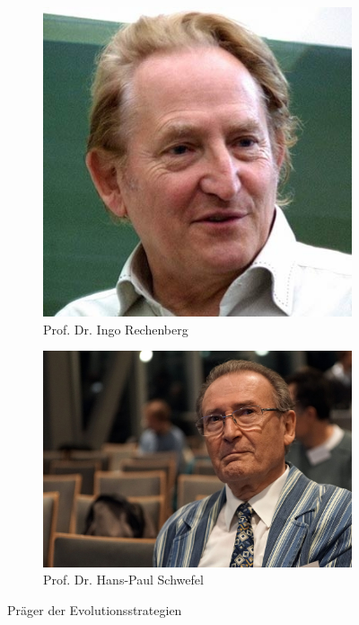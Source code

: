 \begin{figure}[H]
\centering
\begin{subfigure}[b]{0.45\linewidth}
\centering
\includegraphics[height=0.6\textwidth]{img/Prof-Dr-Ingo-Rechenberg.jpg}
\caption[Prof. Dr. Ingo Rechenberg]{Prof. Dr. Ingo Rechenberg\protect\footnotemark}
\label{fig:ingorechenberg}
\end{subfigure}
\hfill
\begin{subfigure}[b]{0.45\linewidth}
\centering
\includegraphics[height=0.6\textwidth]{img/Prof_Dr_Hans-Paul_Schwefel.jpg}
\caption[Prof. Dr. Hans-Paul Schwefel]{Prof. Dr. Hans-Paul Schwefel\protect\footnotemark}
\label{fig:hanspaulschwefel}
\end{subfigure}
\caption{Präger der Evolutionsstrategien}
\label{fig:praeger_der_evolutionsstrategien}
\end{figure}

